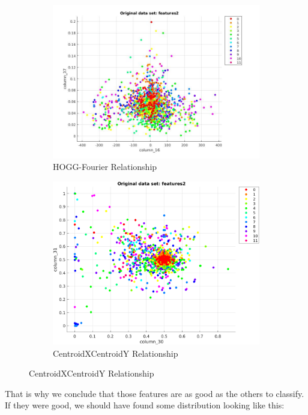 \documentclass[11]{article}
\begin{document}
\begin{figure}[H]
    \begin{subfigure}[t]{0.45\textwidth}
    \centering
  \includegraphics[scale=0.25]{images/fourierHOGG.jpg}
    \caption{HOGG-Fourier Relationship}
    \end{subfigure}
    \begin{subfigure}[t]{0.45\textwidth}
    \centering
    \includegraphics[scale=0.34]{images/centroidXcentroidY.png}
    \caption{CentroidXCentroidY Relationship}
    \end{subfigure}
\end{figure}

That is why we conclude that those features are as good as the others to classify. If they were good, we should have found some distribution looking like this: 
\end{document}
